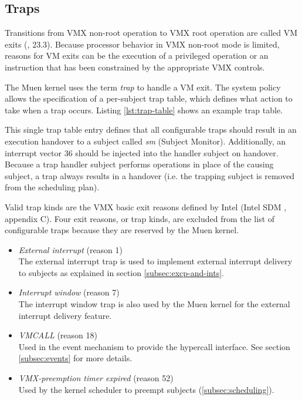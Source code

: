\subsection{Traps}\label{subsec:traps}
Transitions from VMX non-root operation to VMX root operation are called VM
exits (\cite{IntelSDM}, 23.3). Because processor behavior in VMX non-root mode
is limited, reasons for VM exits can be the execution of a privileged operation
or an instruction that has been constrained by the appropriate VMX controls.

The Muen kernel uses the term \emph{trap} to handle a VM exit. The system policy
allows the specification of a per-subject trap table, which defines what action
to take when a trap occurs. Listing \ref{lst:trap-table} shows an example trap
table.



This single trap table entry defines that all configurable traps should result
in an execution handover to a subject called \emph{sm} (Subject
Monitor). Additionally, an interrupt vector 36 should be injected into
the handler subject on handover. Because a trap handler subject performs
operations in place of the causing subject, a trap always results in a handover
(i.e. the trapping subject is removed from the scheduling plan).

Valid trap kinds are the VMX basic exit reasons defined by Intel (Intel SDM
\cite{IntelSDM}, appendix C). Four exit reasons, or trap kinds, are excluded
from the list of configurable traps because they are reserved by the Muen
kernel.

\begin{itemize}
	\item \emph{External interrupt} (reason 1)\\
		The external interrupt trap is used to implement external interrupt
		delivery to subjects as explained in section \ref{subsec:excp-and-ints}.
	\item \emph{Interrupt window} (reason 7)\\
		The interrupt window trap is also used by the Muen kernel for the
		external interrupt delivery feature.
	\item \emph{VMCALL} (reason 18)\\
		Used in the event mechanism to provide the hypercall interface. See
		section \ref{subsec:events} for more details.
	\item \emph{VMX-preemption timer expired} (reason 52)\\
		Used by the kernel scheduler to preempt subjects
		(\ref{subsec:scheduling}).
\end{itemize}


